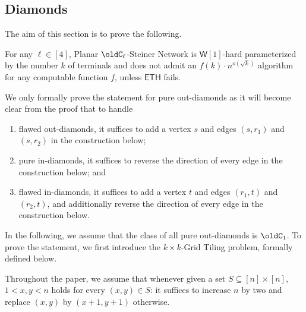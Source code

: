 \subsection{Diamonds}
\label{sec:diamonds}

The aim of this section is to prove the following.

\begin{theorem}
\label{thm:diamond}
For any $\ell \in [4]$, {\sc Planar $\oldC_\ell$-Steiner Network} is $\mathsf{W}[1]$-hard parameterized by the number $k$ of terminals and 
does not admit an $f(k) \cdot n^{o(\sqrt{k})}$ algorithm for any computable function $f$,
unless $\mathsf{ETH}$ fails.
\end{theorem}

We only formally prove the statement for pure out-diamonds as it will become clear from the proof that
to handle 
\begin{enumerate}
\item flawed out-diamonds, it suffices to add a vertex $s$ and edges $(s,r_1)$ and $(s,r_2)$ in the construction below;
\item pure in-diamonds, it suffices to reverse the direction of every edge in the construction below; and
\item flawed in-diamonds, it suffices to add a vertex $t$ and edges $(r_1,t)$ and $(r_2,t)$, and additionally reverse the direction of every edge in the construction below.
\end{enumerate}
In the following, we assume that the class of all pure out-diamonds is $\oldC_1$.
To prove the statement, we first introduce the {\sc $k \times k$-Grid Tiling} problem, formally defined below.\\


\bigskip

Throughout the paper, we assume that whenever given a set $S \subseteq [n] \times [n]$, $1 < x,y < n$ holds for every $(x,y) \in S$: it suffices to increase $n$ by two and replace $(x,y)$ by $(x+1,y+1)$ otherwise.

